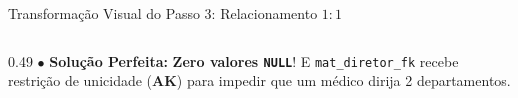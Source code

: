 \begin{frame}{Transformação Visual do Passo 3: Relacionamento $1:1$}
\begin{columns}[t]
\begin{column}{0.49\textwidth}
      \renewcommand{\arraystretch}{1.2}
      \vspace{0.08cm}
      \scriptsize
      $\bullet$ \textbf{Solução Perfeita:} \textbf{Zero valores \texttt{NULL}}! E \texttt{mat\_diretor\_fk} recebe restrição de unicidade (\textbf{AK}) para impedir que um médico dirija 2 departamentos.
    \end{column}
  \end{columns}
\end{frame}
